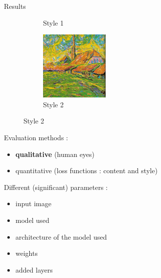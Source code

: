 \documentclass[12pt]{beamer}
\begin{document}
\begin{frame}{Results}
\begin{figure}[H]
\begin{subfigure}[b]{0.25\textwidth}
                \caption{Style 1}
            \end{subfigure}
            \hfill
            \begin{subfigure}[b]{0.25\textwidth}
                \centering
                \includegraphics[width=\textwidth]{resources/gatys/inputs/church.png}
                \caption{Style 2}
            \end{subfigure}
        \end{figure}
        
        Evaluation methods :
        
        \begin{itemize}
            \item {\bf qualitative} (human eyes)
            \item quantitative (loss functions : content and style)
        \end{itemize}
    \end{frame}
    
    \begin{frame}
        Different (significant) parameters :
        
        \begin{itemize}
            \item input image
            \item model used
            \item architecture of the model used
            \item weights
            \item added layers
        \end{itemize}
    \end{frame}
    
\end{document}
